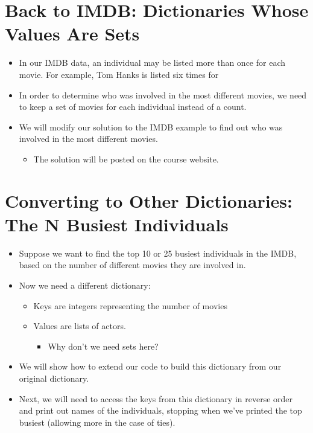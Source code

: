\documentclass[letterpaper,10pt,english]{sphinxmanual}
\begin{document}
\section{Back to IMDB: Dictionaries Whose Values Are Sets}
\label{\detokenize{lecture_notes/lec17_dictionaries2:back-to-imdb-dictionaries-whose-values-are-sets}}\begin{itemize}
\item {} 
In our IMDB data, an individual may be listed more than once for
each movie.  For example, Tom Hanks is listed six times for 

\item {} 
In order to determine who was involved in the most different
movies, we need to keep a set of movies for each individual instead
of a count.

\item {} 
We will modify our solution to the IMDB example to find out who was
involved in the most different movies.
\begin{itemize}
\item {} 
The solution will be posted on the course website.

\end{itemize}

\end{itemize}


\section{Converting to Other Dictionaries:  The N Busiest Individuals}
\label{\detokenize{lecture_notes/lec17_dictionaries2:converting-to-other-dictionaries-the-n-busiest-individuals}}\begin{itemize}
\item {} 
Suppose we want to find the top 10 or 25 busiest individuals in the
IMDB, based on the number of different movies they are involved in.

\item {} 
Now we need a different dictionary:
\begin{itemize}
\item {} 
Keys are integers representing the number of movies

\item {} 
Values are lists of actors.
\begin{itemize}
\item {} 
Why don’t we need sets here?

\end{itemize}

\end{itemize}

\item {} 
We will show how to extend our code to build this dictionary from
our original dictionary.

\item {} 
Next, we will need to access the keys from this dictionary in
reverse order and print out names of the individuals, stopping when
we’ve printed the top  busiest (allowing more in the case of
ties).

\end{itemize}
\end{document}
